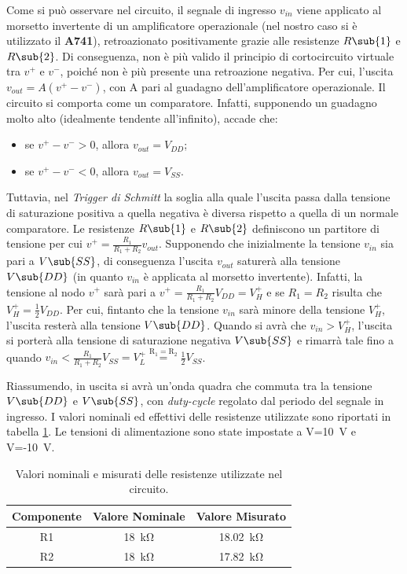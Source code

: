 \noindent
Come si può osservare nel circuito, il segnale di ingresso $v_{in}$ viene applicato al morsetto invertente di un amplificatore operazionale (nel nostro caso si è utilizzato il \textbf{\textmu A741}), retroazionato positivamente grazie alle resistenze $R\sub{1}$ e $R\sub{2}$. Di conseguenza, non è più valido il principio di cortocircuito virtuale tra $v^+$ e $v^-$, poiché non è più presente una retroazione negativa. Per cui, l'uscita $v_{out}=A(v^+-v^-)$, con A pari al guadagno dell'amplificatore operazionale. Il circuito si comporta come un comparatore. Infatti, supponendo un guadagno molto alto (idealmente tendente all'infinito), accade che:
\begin{itemize}
	\item se $v^+-v^->0$, allora $v_{out}=V_{DD}$;
	\item se $v^+-v^-<0$, allora $v_{out}=V_{SS}$.
\end{itemize}
Tuttavia, nel \textit{Trigger di Schmitt} la soglia alla quale l'uscita passa dalla tensione di saturazione positiva a quella negativa è diversa rispetto a quella di un normale comparatore. Le resistenze $R\sub{1}$ e $R\sub{2}$ definiscono un partitore di tensione per cui $v^+=\frac{R_1}{R_1+R_2}v_{out}$. Supponendo che inizialmente la tensione $v_{in}$ sia pari a $V\sub{SS}$, di conseguenza l'uscita $v_{out}$ saturerà alla tensione $V\sub{DD}$ (in quanto $v_{in}$ è applicata al morsetto invertente). Infatti, la tensione al nodo $v^+$ sarà pari a $v^+=\frac{R_1}{R_1+R_2}V_{DD}=V_H^+$ e se $R_1=R_2$ risulta che $V_H^+=\frac{1}{2}V_{DD}$. Per cui, fintanto che la tensione $v_{in}$ sarà minore della tensione $V_H^+$, l'uscita resterà alla tensione $V\sub{DD}$. Quando si avrà che $v_{in}>V_H^+$, l'uscita si porterà alla tensione di saturazione negativa $V\sub{SS}$ e rimarrà tale fino a quando $v_{in}<\frac{R_1}{R_1+R_2}V_{SS}=V_L^+\overset{\mathrm{R_1=R_2}}{=}\frac{1}{2}V_{SS}$. 

\noindent
Riassumendo, in uscita si avrà un'onda quadra che commuta tra la tensione $V\sub{DD}$ e $V\sub{SS}$, con \textit{duty-cycle} regolato dal periodo del segnale in ingresso. I valori nominali ed effettivi delle resistenze utilizzate sono riportati in tabella \ref{tab:valori_componenti_2}. Le tensioni di alimentazione sono state impostate a V=\SI{10}{\volt} e V=-\SI{10}{\volt}.

\def\arraystretch{1.3}
\begin{table}[h]
	\centering
	\begin{tabular}{|c|c|c|}
		\hline
		Componente	& Valore Nominale & Valore Misurato \\ \hline
		R1 &\SI{18}{\kilo\ohm} & \SI{18,02}{\kilo\ohm} \\ \hline
		R2 &\SI{18}{\kilo\ohm} & \SI{17,82}{\kilo\ohm} \\ \hline
	\end{tabular}
	\caption{Valori nominali e misurati delle resistenze utilizzate nel circuito.}
	\label{tab:valori_componenti_2}
\end{table}

